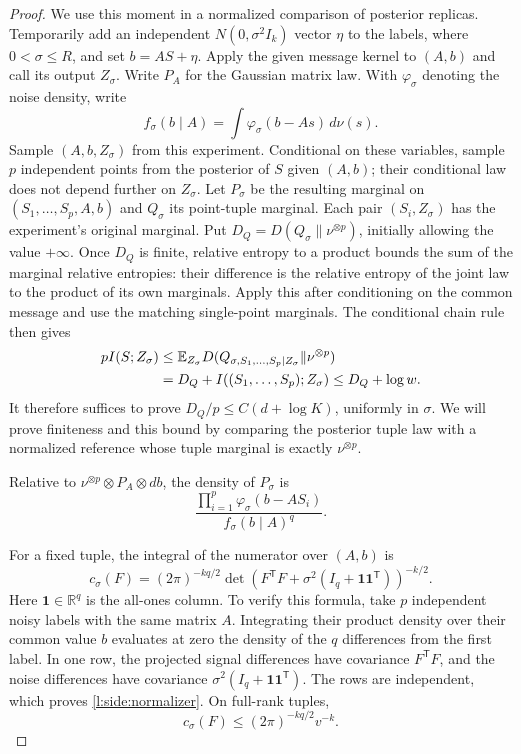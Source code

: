 \begin{proof}
We use this moment in a normalized comparison of posterior replicas.
Temporarily add an independent $N(0,\sigma^2I_k)$ vector $\eta$ to the
labels, where $0<\sigma\le R$, and set $b=AS+\eta$.  Apply the given
message kernel to $(A,b)$ and call its output $Z_\sigma$.  Write $P_A$
for the Gaussian matrix law.  With $\varphi_\sigma$ denoting the noise density, write
\[
 f_\sigma(b\mid A)=\int\varphi_\sigma(b-As)\,d\nu(s).
\]
Sample $(A,b,Z_\sigma)$ from this experiment.  Conditional on these
variables, sample $p$ independent points from the posterior of $S$
given $(A,b)$; their conditional law does not depend further on
$Z_\sigma$.  Let $P_\sigma$ be the resulting marginal on
$(S_1,\ldots,S_p,A,b)$ and $Q_\sigma$ its point-tuple marginal.
Each pair $(S_i,Z_\sigma)$ has the experiment's original marginal.
Put $D_Q=D(Q_\sigma\|\nu^{\otimes p})$, initially allowing the value
$+\infty$.  Once $D_Q$ is finite, relative entropy to a product bounds
the sum of the marginal relative entropies: their difference is the
relative entropy of the joint law to the product of its own marginals.
Apply this after conditioning on the common message and use the matching
single-point marginals.  The conditional chain rule then gives
\begin{align}
 pI(S;Z_\sigma)
 &\le\mathbb E_{Z_\sigma}
   D(Q_{\sigma,S_1,\ldots,S_p\mid Z_\sigma}\|\nu^{\otimes p})\notag\\
 &=D_Q+I((S_1,\ldots,S_p);Z_\sigma)
 \le D_Q+\log w.
 \label{l:side:replica-message}
\end{align}
It therefore suffices to prove $D_Q/p\le C(d+\log K)$, uniformly in
$\sigma$.  We will prove finiteness and this bound by comparing the
posterior tuple law with a normalized reference whose tuple marginal is
exactly $\nu^{\otimes p}$.

Relative to $\nu^{\otimes p}\otimes P_A\otimes db$, the density of
$P_\sigma$ is
\begin{equation}\label{l:side:auxiliary-density}
 \frac{\prod_{i=1}^p\varphi_\sigma(b-AS_i)}
      {f_\sigma(b\mid A)^q}.
\end{equation}

For a fixed tuple, the integral of the numerator over $(A,b)$ is
\begin{equation}\label{l:side:normalizer}
 c_\sigma(F)=(2\pi)^{-kq/2}
 \det\!\left(F^{\mathsf T}F+
       \sigma^2(I_q+\mathbf1\mathbf1^{\mathsf T})\right)^{-k/2}.
\end{equation}
Here $\mathbf1\in\mathbb R^q$ is the all-ones column.
To verify this formula, take $p$ independent noisy labels with the
same matrix $A$.  Integrating their product density over their common
value $b$ evaluates at zero the density of the $q$ differences from
the first label.  In one row, the projected signal differences have
covariance $F^{\mathsf T}F$, and the noise differences have covariance
$\sigma^2(I_q+\mathbf1\mathbf1^{\mathsf T})$.  The rows are independent,
which proves \eqref{l:side:normalizer}.  On full-rank tuples,
\begin{equation}\label{l:side:normalizer-volume}
 c_\sigma(F)\le(2\pi)^{-kq/2}v^{-k}.
\end{equation}


\end{proof}
